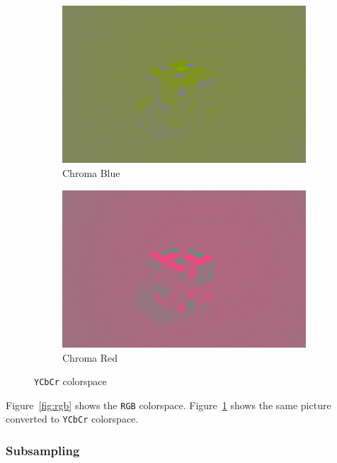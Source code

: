 \documentclass{article}
\begin{document}
\begin{figure}[h!]
\begin{subfigure}[b]{0.4\textwidth}
\begin{center}
	\includegraphics[width=\textwidth]{./implementation/experiment/Cb.png}
\end{center}
\caption{Chroma Blue}
\end{subfigure}
\begin{subfigure}[b]{0.4\textwidth}
\begin{center}
	\includegraphics[width=\textwidth]{./implementation/experiment/Cr.png}
\end{center}
\caption{Chroma Red}
\end{subfigure}
\caption{\texttt{YCbCr} colorspace}
\label{fig:ycbcr}
\end{figure}

Figure~\ref{fig:rgb} shows the \texttt{RGB} colorspace.
Figure~\ref{fig:ycbcr} shows the same picture converted to \texttt{YCbCr} colorspace.

\subsubsection{Subsampling}
\end{document}
